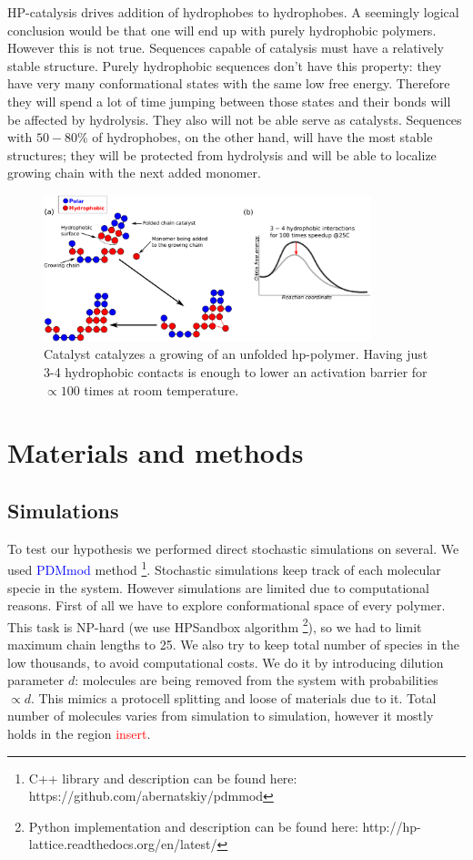 \documentclass[12pt]{paper}
\newcommand{\red}[1]{\textcolor{red}{#1}}
\newcommand{\blue}[1]{\textcolor{blue}{#1}}
\begin{document}
HP-catalysis drives addition of hydrophobes to hydrophobes. A seemingly logical conclusion would 
be that one will end up with purely hydrophobic polymers. However this is not true. Sequences 
capable of catalysis must have a relatively stable structure. Purely hydrophobic sequences don't 
have this property: they have very many conformational states with the same low free energy. 
Therefore they will spend a lot of time jumping between those states and their bonds will be 
affected by hydrolysis. They also will not be able serve as catalysts. Sequences with $50-80\%$ 
of hydrophobes, on the other hand, will have the most stable structures; they will 
be protected from hydrolysis and will be able to localize growing chain with the next added 
monomer.
\begin{figure}[h!]
  \centering
  \includegraphics[width=0.85\textwidth]{pictures/hp-catalysis.pdf} 
  \caption{Catalyst catalyzes a growing of an unfolded hp-polymer. 
           Having just 3-4 hydrophobic contacts is enough to lower an 
           activation barrier for $\propto 100$ times at room 
           temperature.}
  \label{fig:hp-catalysis}
\end{figure}


\section{Materials and methods}\label{sec:mat}
\subsection{Simulations}\label{sec:mat-sim}
To test our hypothesis we performed direct stochastic simulations on several. We used 
\blue{PDMmod} method \cite{Bernatskiy}\footnote{C++ library and description can be found 
here: https://github.com/abernatskiy/pdmmod}. Stochastic simulations keep track of each 
molecular specie in the system. However simulations are limited due to computational reasons. First 
of all we have to explore conformational space of every polymer. This task is NP-hard (we use 
HPSandbox algorithm\cite{lau1989lattice,Dill2008} \footnote{Python implementation and description 
can be found here: http://hp-lattice.readthedocs.org/en/latest/}), so we had to limit 
maximum chain lengths to 25. We also try to keep total number of species in the low thousands, to 
avoid computational costs. We do it by introducing dilution parameter $d$: molecules are being 
removed from the system with probabilities $\propto d$. This mimics a protocell splitting and 
loose of materials due to it. Total number of molecules varies from simulation to simulation, 
however it mostly holds in the region \red{insert}.
\end{document}
